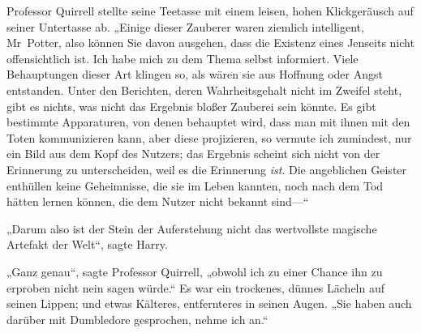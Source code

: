 Professor Quirrell stellte seine Teetasse mit einem leisen, hohen Klickgeräusch auf seiner Untertasse ab. „Einige dieser Zauberer waren ziemlich intelligent, Mr~Potter, also können Sie davon ausgehen, dass die Existenz eines Jenseits nicht offensichtlich ist. Ich habe mich zu dem Thema selbst informiert. Viele Behauptungen dieser Art klingen so, als wären sie aus Hoffnung oder Angst entstanden. Unter den Berichten, deren Wahrheitsgehalt nicht im Zweifel steht, gibt es nichts, was nicht das Ergebnis bloßer Zauberei sein könnte. Es gibt bestimmte Apparaturen, von denen behauptet wird, dass man mit ihnen mit den Toten kommunizieren kann, aber diese projizieren, so vermute ich zumindest, nur ein Bild aus dem Kopf des Nutzers; das Ergebnis scheint sich nicht von der Erinnerung zu unterscheiden, weil es die Erinnerung \emph{ist}. Die angeblichen Geister enthüllen keine Geheimnisse, die sie im Leben kannten, noch nach dem Tod hätten lernen können, die dem Nutzer nicht bekannt sind—“

„Darum also ist der Stein der Auferstehung nicht das wertvollste magische Artefakt der Welt“, sagte Harry.

„Ganz genau“, sagte Professor Quirrell, „obwohl ich zu einer Chance ihn zu erproben nicht nein sagen würde.“ Es war ein trockenes, dünnes Lächeln auf seinen Lippen; und etwas Kälteres, entfernteres in seinen Augen. „Sie haben auch darüber mit Dumbledore gesprochen, nehme ich an.“

